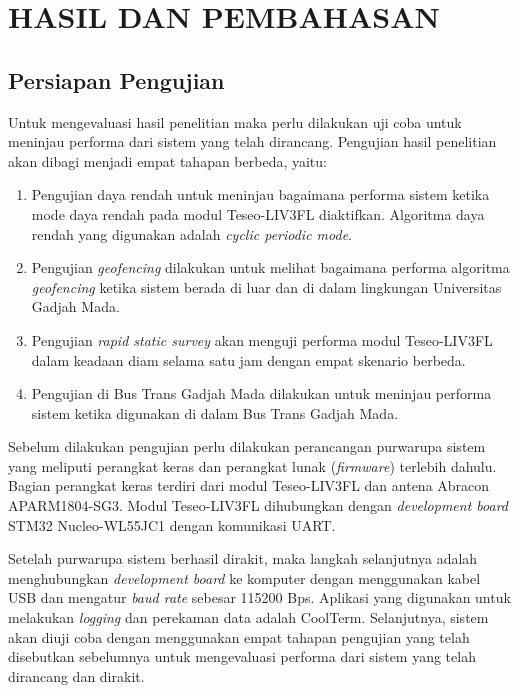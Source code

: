 \chapter{HASIL DAN PEMBAHASAN}

\section{Persiapan Pengujian}
Untuk mengevaluasi hasil penelitian maka perlu dilakukan uji coba untuk meninjau performa dari sistem yang telah dirancang. Pengujian hasil penelitian akan dibagi menjadi empat tahapan berbeda, yaitu:

\begin{enumerate}
	\item Pengujian daya rendah untuk meninjau bagaimana performa sistem ketika mode daya rendah pada modul Teseo\hyp{}LIV3FL diaktifkan. Algoritma daya rendah yang digunakan adalah \textit{cyclic periodic mode}.
	\item Pengujian \textit{geofencing} dilakukan untuk melihat bagaimana performa algoritma \textit{geofencing} ketika sistem berada di luar dan di dalam lingkungan Universitas Gadjah Mada.
	\item Pengujian \textit{rapid static survey} akan menguji performa modul Teseo\hyp{}LIV3FL dalam keadaan diam selama satu jam dengan empat skenario berbeda.
	\item Pengujian di Bus Trans Gadjah Mada dilakukan untuk meninjau performa sistem ketika digunakan di dalam Bus Trans Gadjah Mada.
\end{enumerate}

Sebelum dilakukan pengujian perlu dilakukan perancangan purwarupa sistem yang meliputi perangkat keras dan perangkat lunak (\textit{firmware}) terlebih dahulu. Bagian perangkat keras terdiri dari modul Teseo\hyp{}LIV3FL dan antena Abracon APARM1804-SG3. Modul Teseo\hyp{}LIV3FL dihubungkan dengan \textit{development board} STM32 Nucleo-WL55JC1 dengan komunikasi UART.

Setelah purwarupa sistem berhasil dirakit, maka langkah selanjutnya adalah menghubungkan \textit{development board} ke komputer dengan menggunakan kabel USB dan mengatur \textit{baud rate} sebesar 115200 Bps. Aplikasi yang digunakan untuk melakukan \textit{logging} dan perekaman data adalah CoolTerm. Selanjutnya, sistem akan diuji coba dengan menggunakan empat tahapan pengujian yang telah disebutkan sebelumnya untuk mengevaluasi performa dari sistem yang telah dirancang dan dirakit.

